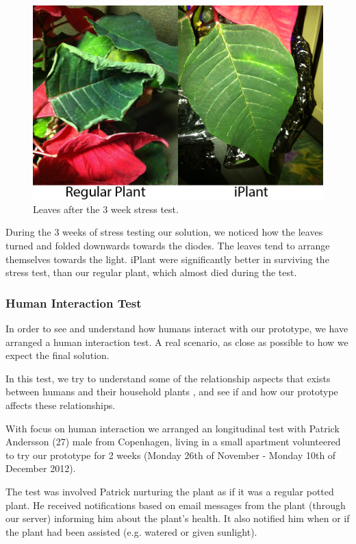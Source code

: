 \documentclass{ubicomp2012}
\begin{document}
\begin{figure}[h!]
\centering
\includegraphics[width=\columnwidth]{leaf_test.png}
\caption{Leaves after the 3 week stress test.}
\label{fig:leaf_test}
\end{figure}

During the 3 weeks of stress testing our solution, we noticed how the leaves turned and folded downwards towards the diodes. The leaves tend to arrange themselves towards the light.
iPlant were significantly better in surviving the stress test, than our regular plant, which almost died during the test.

\subsubsection{Human Interaction Test}
In order to see and understand how humans interact with our prototype, we have arranged a human interaction test. A real scenario, as close as possible to how we expect the final solution.

In this test, we try to understand some of the relationship aspects that exists between humans and their household plants \cite{People-Plant-Relationship}, and see if and how our prototype affects these relationships.

With focus on human interaction we arranged an longitudinal test with Patrick Andersson (27) male from Copenhagen, living in a small apartment volunteered to try our prototype for 2 weeks (Monday 26th of November - Monday 10th of December 2012).

The test was involved Patrick nurturing the plant as if it was a regular potted plant. He received notifications based on email messages from the plant (through our server) informing him about the plant’s health. It also notified him when or if the plant had been assisted (e.g. watered or given sunlight).
\end{document}
